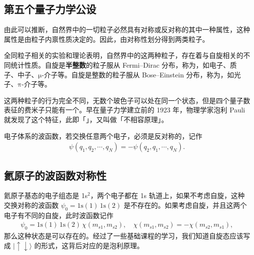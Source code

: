 \subsection{第五个量子力学公设}
由此可以推断，自然界中的一切粒子必然具有对称或反对称的其中一种属性，这种属性是由粒子内禀性质决定的。因此，由对称性划分得到两类粒子。

全同粒子相关的实验和理论表明，自然界中的这两种粒子，存在着与自旋相关的不同统计性质。自旋是\textbf{半整数}的粒子服从 Fermi--Dirac 分布，称为，如电子、质子、中子、$\mathrm{\mu}$-介子等。自旋是整数的粒子服从 Bose--Einstein 分布，称为，如光子、$\mathrm{\pi}$-介子等。

这两种粒子的行为完全不同，无数个玻色子可以处在同一个状态，但是四个量子数表征的费米子只能有一个。早在量子力学建立前的 1923 年，物理学家泡利 Pauli 就发现了这个特征，此即「」，又叫做「不相容原理」。%

\begin{theorem}[公设5]
    电子体系的波函数，若交换任意两个电子，必须是反对称的，记作
    \begin{align}
        \psi(q_1, q_2, \cdots, q_N) = -\psi(q_2, q_1, \cdots, q_N).
    \end{align}
\end{theorem}


\subsection{氦原子的波函数对称性}
氦原子基态的电子组态是 1s$^2$，两个电子都在 1s 轨道上，如果不考虑自旋，这种交换对称的波函数 $\psi_0 = \mathrm{1s(1)\, 1s(2)}$ 是不存在的。如果考虑自旋，并且这两个电子有不同的自旋，此时波函数记作
\begin{align}
    \psi_0 = \mathrm{1s(1)\,1s(2)}\, \chi(m_{s1},m_{s2}), \quad
    \chi(m_{s1}, m_{s2}) = -\chi(m_{s2}, m_{s1}),
\end{align}
那么这种状态是可以存在的。经过了一些基础课程的学习，我们知道自旋态应该写成 
$|\!\uparrow\downarrow\rangle$ 的形式，这背后对应的是泡利原理。

